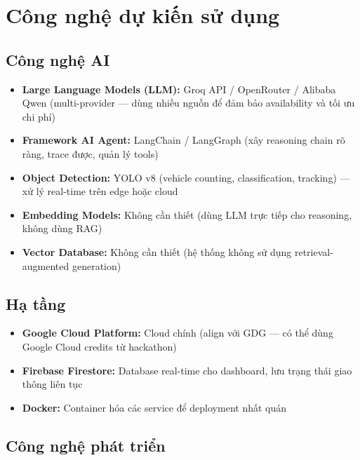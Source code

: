 \documentclass[12pt,a4paper]{article}
\begin{document}
\section{Công nghệ dự kiến sử dụng}

\subsection{Công nghệ AI}

\begin{itemize}
    \item \textbf{Large Language Models (LLM):} Groq API / OpenRouter / Alibaba Qwen (multi-provider — dùng nhiều nguồn để đảm bảo availability và tối ưu chi phí)
    \item \textbf{Framework AI Agent:} LangChain / LangGraph (xây reasoning chain rõ ràng, trace được, quản lý tools)
    \item \textbf{Object Detection:} YOLO v8 (vehicle counting, classification, tracking) — xử lý real-time trên edge hoặc cloud
    \item \textbf{Embedding Models:} Không cần thiết (dùng LLM trực tiếp cho reasoning, không dùng RAG)
    \item \textbf{Vector Database:} Không cần thiết (hệ thống không sử dụng retrieval-augmented generation)
\end{itemize}

\subsection{Hạ tầng}

\begin{itemize}
    \item \textbf{Google Cloud Platform:} Cloud chính (align với GDG — có thể dùng Google Cloud credits từ hackathon)
    \item \textbf{Firebase Firestore:} Database real-time cho dashboard, lưu trạng thái giao thông liên tục
    \item \textbf{Docker:} Container hóa các service để deployment nhất quán
\end{itemize}

\subsection{Công nghệ phát triển}
\end{document}
